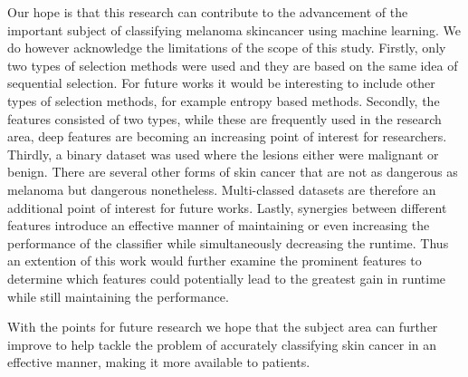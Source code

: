 \documentclass{kththesis}
\begin{document}
Our hope is that this research can contribute to the  advancement of the important subject of classifying melanoma skincancer using machine learning. We do however acknowledge the limitations of the scope of this study. Firstly, only two types of selection methods were used and they are based on the same idea of sequential selection. For future works it would be interesting to include other types of selection methods, for example entropy based methods. Secondly, the features consisted of two types, while these are frequently used in the research area, deep features are becoming an increasing point of interest for researchers. Thirdly, a binary dataset was used where the lesions either were malignant or benign. There are several other forms of skin cancer that are not as dangerous as melanoma but dangerous nonetheless. Multi-classed datasets are therefore an additional point of interest for future works. Lastly, synergies between different features introduce an effective manner of maintaining or even increasing the performance of the classifier while simultaneously decreasing the runtime. Thus an extention of this work would further examine the prominent features to determine which features could potentially lead to the greatest gain in runtime while still maintaining the performance.

With the points for future research we hope that the subject area can further improve to help tackle the problem of accurately classifying skin cancer in an effective manner, making it more available to patients. 

\printbibliography[heading=bibintoc]


\tailmatter
\end{document}
